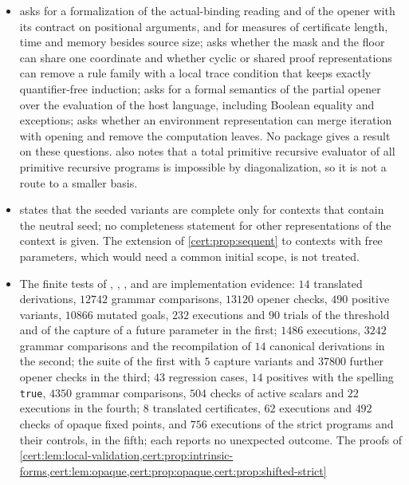 \begin{itemize}
\cref{cert:rem:floor-order}; these variants are not programs of the table.
\item {} asks for a formalization of the actual-binding reading and of
the opener with its contract on positional arguments, and for measures of certificate
length, time and memory besides source size;  asks whether the mask and
the floor can share one coordinate and whether cyclic or shared proof representations can
remove a rule family with a local trace condition that keeps exactly quantifier-free
induction;  asks for a formal semantics of the partial opener
over the evaluation of the host language, including Boolean equality and exceptions;
 asks whether an environment representation can merge
iteration with opening and remove the computation leaves. No package gives a result on
these questions.  also notes that a total primitive recursive evaluator
of all primitive recursive programs is impossible by diagonalization, so it is not a
route to a smaller basis.
\item {} states that the seeded variants are complete only for
contexts that contain the neutral seed; no completeness statement for other
representations of the context is given. The extension of \cref{cert:prop:sequent} to
contexts with free parameters, which would need a common initial scope, is not treated.
\item The finite tests of , ,
,  and  are
implementation evidence: $14$ translated derivations, $12742$ grammar comparisons, $13120$ opener
checks, $490$ positive variants, $10866$ mutated goals, $232$ executions and $90$ trials of the
threshold and of the capture of a future parameter in the first; $1486$ executions, $3242$ grammar
comparisons and the recompilation of $14$ canonical derivations in the second; the suite of the
first with $5$ capture variants and $37800$ further opener checks in the third; $43$ regression
cases, $14$ positives with the spelling \texttt{true}, $4350$ grammar comparisons, $504$ checks of
active scalars and $22$ executions in the fourth; $8$ translated certificates, $62$ executions and
$492$ checks of opaque fixed points, and $756$ executions of the strict programs and their controls,
in the fifth; each reports no unexpected outcome. The proofs of
\cref{cert:lem:local-validation,cert:prop:intrinsic-forms,cert:lem:opaque,cert:prop:opaque,cert:prop:shifted-strict}

\end{itemize}
